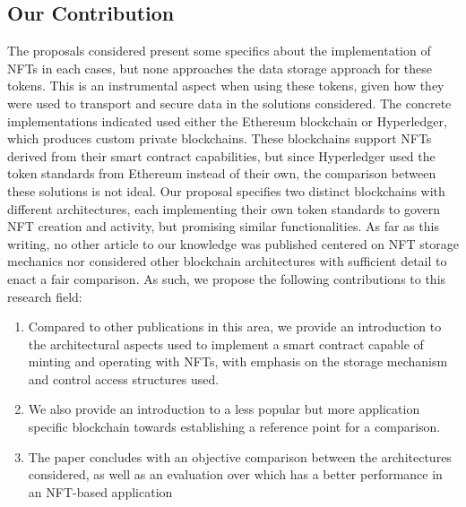 \documentclass[../main.tex]{subfiles}
\begin{document}
\subsection{Our Contribution}
The proposals considered present some specifics about the implementation of NFTs in each cases, but none approaches the data storage approach for these tokens. This is an instrumental aspect when using these tokens, given how they were used to transport and secure data in the solutions considered. The concrete implementations indicated used either the Ethereum blockchain or Hyperledger, which produces custom private blockchains. These blockchains support NFTs derived from their smart contract capabilities, but since Hyperledger used the token standards from Ethereum instead of their own, the comparison between these solutions is not ideal. Our proposal specifies two distinct blockchains with different architectures, each implementing their own token standards to govern NFT creation and activity, but promising similar functionalities. As far as this writing, no other article to our knowledge was published centered on NFT storage mechanics nor considered other blockchain architectures with sufficient detail to enact a fair comparison. As such, we propose the following contributions to this research field:
\begin{enumerate}
    \item{Compared to other publications in this area, we provide an introduction to the architectural aspects used to implement a smart contract capable of minting and operating with NFTs, with emphasis on the storage mechanism and control access structures used.}
    \item {We also provide an introduction to a less popular but more application specific blockchain towards establishing a reference point for a comparison.}
    \item {The paper concludes with an objective comparison between the architectures considered, as well as an evaluation over which has a better performance in an NFT-based application}
\end{enumerate}
\end{document}
